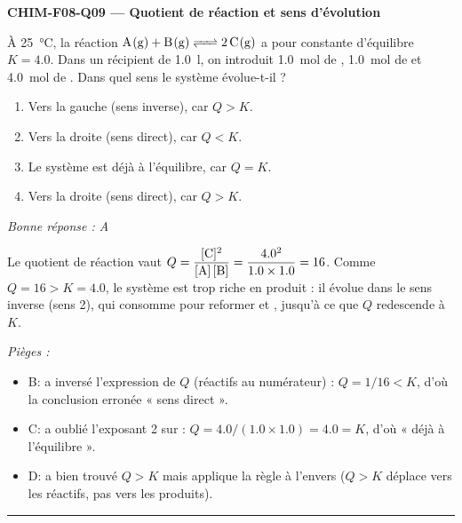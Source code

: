 \documentclass[11pt,a4paper]{article}
\begin{document}
\noindent\textbf{CHIM-F08-Q09 --- Quotient de réaction et sens d'évolution}\par
À \qty{25}{\celsius}, la réaction $\ce{A(g) + B(g) <=> 2 C(g)}$ a pour constante d'équilibre $K=\num{4.0}$. Dans un récipient de \qty{1.0}{\litre}, on introduit \qty{1.0}{\mol} de , \qty{1.0}{\mol} de  et \qty{4.0}{\mol} de . Dans quel sens le système évolue-t-il ?
\begin{enumerate}[label=\Alph*)]
\item Vers la gauche (sens inverse), car $Q>K$.
\item Vers la droite (sens direct), car $Q<K$.
\item Le système est déjà à l'équilibre, car $Q=K$.
\item Vers la droite (sens direct), car $Q>K$.
\end{enumerate}
\textit{Bonne réponse : A}\par
Le quotient de réaction vaut $Q=\dfrac{[\ce{C}]^2}{[\ce{A}]\,[\ce{B}]}=\dfrac{\num{4.0}^2}{\num{1.0}\times\num{1.0}}=16$. Comme $Q=16>K=\num{4.0}$, le système est trop riche en produit  : il évolue dans le sens inverse (sens 2), qui consomme  pour reformer  et , jusqu'à ce que $Q$ redescende à $K$.\par
\textit{Pièges :}
\begin{itemize}
\item B: a inversé l'expression de $Q$ (réactifs au numérateur) : $Q=1/16<K$, d'où la conclusion erronée « sens direct ».
\item C: a oublié l'exposant 2 sur  : $Q=\num{4.0}/(\num{1.0}\times\num{1.0})=\num{4.0}=K$, d'où « déjà à l'équilibre ».
\item D: a bien trouvé $Q>K$ mais applique la règle à l'envers ($Q>K$ déplace vers les réactifs, pas vers les produits).
\end{itemize}
\vspace{8pt}\hrule\vspace{8pt}
\end{document}
